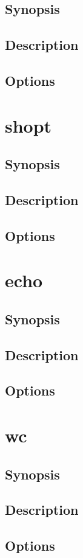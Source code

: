 \documentclass[a4paper, 10pt, onecolumn, openright, oneside]{book}
\begin{document}
			\subsection{Synopsis}
			\subsection{Description}
			\subsection{Options}
		\section{shopt}
			\subsection{Synopsis}
			\subsection{Description}
			\subsection{Options}
		\section{echo}
			\subsection{Synopsis}
			\subsection{Description}
			\subsection{Options}
		\section{wc}
			\subsection{Synopsis}
			\subsection{Description}
			\subsection{Options}
\end{document}
